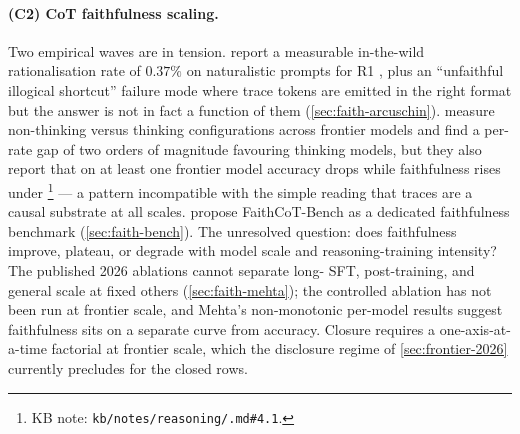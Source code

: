 \paragraph{(C2) CoT faithfulness scaling.}
Two empirical waves are in tension. 
report a measurable in-the-wild rationalisation rate of $0.37\%$ on
naturalistic prompts for R1 \citep[abstract]{arcuschin2025-cot-wild},
plus an ``unfaithful illogical shortcut'' failure mode where trace
tokens are emitted in the right format but the answer is not in fact a
function of them (\cref{sec:faith-arcuschin}). 
measure non-thinking versus thinking configurations across frontier
models and find a per-rate gap of two orders of magnitude favouring
thinking models, but they also report that on at least one frontier
model accuracy drops while faithfulness rises under 
\citep[\S 4]{mehta2026-faithfulness-scaling}\footnote{KB note:
\texttt{kb/notes/reasoning/.md\#4.1}.} --- a pattern
incompatible with the simple reading that traces are a causal substrate
at all scales.  propose FaithCoT-Bench
as a dedicated faithfulness benchmark
(\cref{sec:faith-bench}). The unresolved question: does faithfulness
improve, plateau, or degrade with model scale and reasoning-training
intensity? The published 2026 ablations cannot separate long- SFT,
 post-training, and general scale at fixed others
(\cref{sec:faith-mehta}); the controlled ablation has not been run at
frontier scale, and Mehta's non-monotonic per-model results suggest
faithfulness sits on a separate curve from accuracy. Closure requires
a one-axis-at-a-time factorial at frontier scale, which the disclosure
regime of \cref{sec:frontier-2026} currently precludes for the closed
rows.

